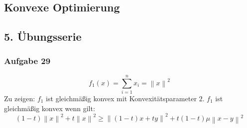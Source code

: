 \documentclass{article}
\newcommand{\norm}[1]{\left\lVert#1\right\rVert}
\begin{document}
\begin{center}
	\section*{Konvexe Optimierung}
	\subsection*{5. Übungsserie}
\end{center}

\subsubsection*{Aufgabe 29}
\begin{equation}
f_1(x) = \sum\limits_{i=1}^n x_i = \norm{x}^2
\end{equation}
Zu zeigen: $f_1$ ist gleichmäßig konvex mit Konvexitätsparameter $2$. $f_1$ ist gleichmäßig konvex wenn gilt:
\begin{equation}
(1-t)\norm{x}^2 + t \norm{x}^2 \geq \norm{(1-t)x + ty}^2 + t(1-t)\mu \norm{x -y}^2
\end{equation}
\end{document}
